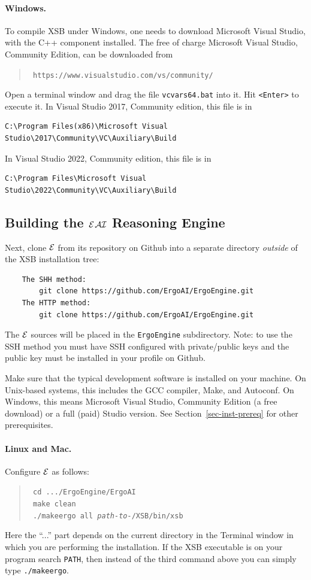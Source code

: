 \documentclass[11pt]{article}
\newcommand{\ERGO}{\mbox{\ensuremath{\cal{E}}\smaller{{\sc{RGO}}}}\xspace}
\newcommand{\ERGOAI}{\mbox{{\ensuremath{\cal{E}}\smaller{{\sc{RGO}}}}\ensuremath{\cal{AI}}}\xspace}
\newcommand{\FLSYSTEM}{\ERGO}
\begin{document}
\paragraph{Windows.}
To compile XSB under Windows, one needs to download Microsoft Visual Studio,
with the C++ component installed.
The free of charge Microsoft Visual Studio, Community Edition, can be
downloaded from
\begin{quote}
\tt
 https://www.visualstudio.com/vs/community/
\end{quote}

Open a terminal window and drag the file \texttt{vcvars64.bat} into it.
Hit \texttt{<Enter>} to execute it. 
In Visual Studio 2017, Community edition, this file is in
\begin{verbatim}
C:\Program Files(x86)\Microsoft Visual Studio\2017\Community\VC\Auxiliary\Build
\end{verbatim}
In Visual Studio 2022, Community edition, this file is in
\begin{verbatim}
C:\Program Files\Microsoft Visual Studio\2022\Community\VC\Auxiliary\Build
\end{verbatim}


\subsection{Building the \ERGOAI Reasoning Engine}

\sloppy
Next, clone \FLSYSTEM from its repository on Github
into a
separate directory \emph{outside} of the XSB installation tree:
\begin{verbatim}
    The SHH method:
        git clone https://github.com/ErgoAI/ErgoEngine.git
    The HTTP method:
        git clone https://github.com/ErgoAI/ErgoEngine.git
\end{verbatim}
The \FLSYSTEM
sources will be placed in the {\tt ErgoEngine} subdirectory.
Note: to use the SSH method you  must have SSH configured with
private/public keys and the public key must be installed in your profile on
Github.

Make sure that the typical development software is installed on your
machine. On Unix-based systems, this includes the GCC compiler, Make, and
Autoconf. On Windows, this means Microsoft Visual Studio, Community Edition
(a free download) or a full (paid) Studio version.
See Section~\ref{sec-inst-prereq} for other prerequisites.

\paragraph{Linux and Mac.}
Configure \FLSYSTEM as follows:
\begin{quote}
  \tt
   cd .../ErgoEngine/ErgoAI\\
   \tt
   make clean\\
   \tt
   ./makeergo all \textnormal{\emph{path-to-}}/XSB/bin/xsb
\end{quote}
Here the ``...'' part depends on the current directory in the Terminal window
in which you are performing the installation.
If the XSB executable is on your program search {\tt PATH}, then instead of the
third command above you can simply type
\texttt{./makeergo}. 
\end{document}
